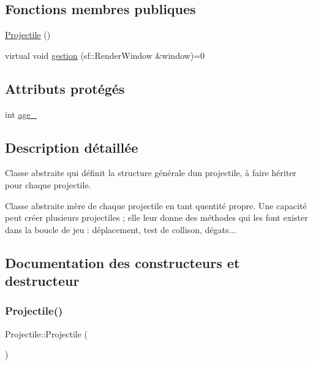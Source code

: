 \subsection*{Fonctions membres publiques}
\begin{DoxyCompactItemize}
\item 
\hyperlink{class_projectile_ac536ed2aad56af866a2078b9a85aa16d}{Projectile} ()
\item 
virtual void \hyperlink{class_projectile_aa969857f9837d9be3a6ea415c9ba3ff1}{gestion} (sf\+::\+Render\+Window \&window)=0
\end{DoxyCompactItemize}
\subsection*{Attributs protégés}
\begin{DoxyCompactItemize}
\item 
int \hyperlink{class_projectile_a1f0a231e002d4796c32ccfeb36c887b1}{age\+\_\+}
\end{DoxyCompactItemize}


\subsection{Description détaillée}
Classe abstraite qui définit la structure générale d\textquotesingle{}un projectile, à faire hériter pour chaque projectile. 

Classe abstraite mère de chaque projectile en tant qu\textquotesingle{}entité propre. Une capacité peut créer plusieurs projectiles ; elle leur donne des méthodes qui les font exister dans la boucle de jeu \+: déplacement, test de collison, dégats... 

\subsection{Documentation des constructeurs et destructeur}
\mbox{\label{class_projectile_ac536ed2aad56af866a2078b9a85aa16d}} 
\subsubsection{\texorpdfstring{Projectile()}{Projectile()}}
{\footnotesize\ttfamily Projectile\+::\+Projectile (\begin{DoxyParamCaption}{ }\end{DoxyParamCaption})}



